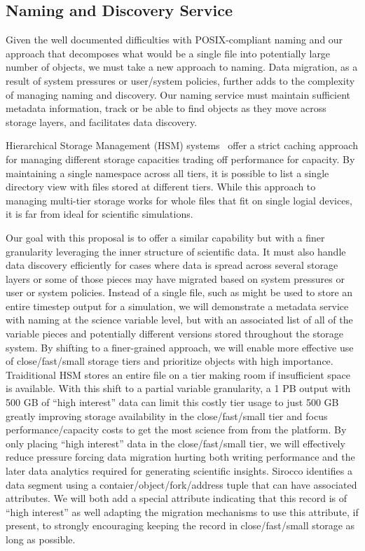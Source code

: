 \subsection{Naming and Discovery Service}

Given the well documented difficulties with POSIX-compliant naming and our
approach that decomposes what would be a single file into potentially large
number of objects, we must take a new approach to naming.  Data migration, as a
result of system pressures or user/system policies, further adds to the
complexity of managing naming and discovery. Our naming service must maintain
sufficient metadata information, track or be able to find objects as they move
across storage layers, and facilitates data discovery.

Hierarchical Storage Management (HSM) systems~\cite{hsm} offer a strict caching approach
for managing different storage capacities trading off performance for capacity.
By maintaining a single namespace across all tiers, it is possible to list a
single directory view with files stored at different tiers. While this approach
to managing multi-tier storage works for whole files that fit on single logial
devices, it is far from ideal for scientific simulations.

Our goal with this proposal is to offer a similar capability but with a finer
granularity leveraging the inner structure of scientific data. It must also
handle data discovery efficiently for cases where data is spread across several
storage layers or some of those pieces may have migrated based on system
pressures or user or system policies. Instead of a single file, such as might
be used to store an entire timestep output for a simulation, we will
demonstrate a metadata service with naming at the science variable level, but
with an associated list of all of the variable pieces and potentially different
versions stored throughout the storage system. By shifting to a finer-grained
approach, we will enable more effective use of close/fast/small storage tiers
and prioritize objects with high importance.  Traiditional HSM stores an entire
file on a tier making room if insufficient space is available.  With this shift
to a partial variable granularity, a 1 PB output with 500 GB of ``high
interest'' data can limit this costly tier usage to just 500 GB greatly
improving storage availability in the close/fast/small tier and focus
performance/capacity costs to get the most science from from the platform.  By
only placing ``high interest'' data in the close/fast/small tier, we will
effectively reduce pressure forcing data migration hurting both writing
performance and the later data analytics required for generating scientific
insights.  Sirocco identifies a data segment using a
contaier/object/fork/address tuple that can have associated attributes. We will
both add a special attribute indicating that this record is of ``high
interest'' as well adapting the migration mechanisms to use this attribute, if
present, to strongly encouraging keeping the record in close/fast/small storage
as long as possible.

